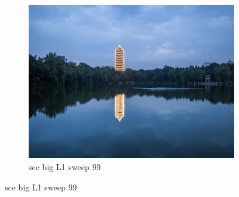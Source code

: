 \documentclass[11pt]{article}
\begin{document}
\begin{figure}[ht!]
\begin{subfigure}[]{0.333\linewidth}
        \centering
        \includegraphics[width=\linewidth]{fig/restoration/sce_big/L1/gibbs_99.jpg}
        \caption{sce big L1 sweep 99}
    \end{subfigure}%
\end{figure}
\end{document}
